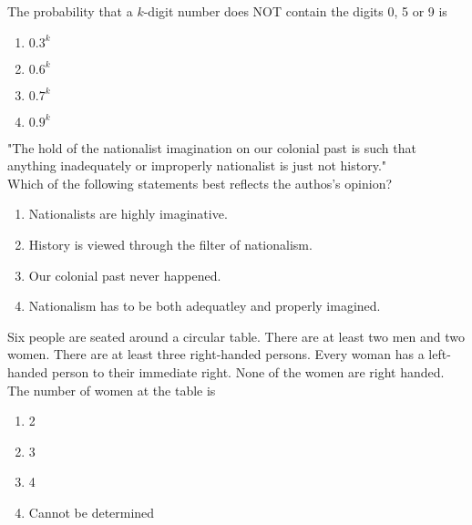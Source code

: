     \item The probability that a $k$-digit number does NOT contain the digits 0, 5 or 9 is
        \hfill{}
        \begin{multicols}{4}
            \begin{enumerate}
                \item $0.3^k$
                    \columnbreak
                \item $0.6^k$
                    \columnbreak
                \item $0.7^k$
                    \columnbreak
                \item $0.9^k$
            \end{enumerate}
        \end{multicols}

    \item "The hold of the nationalist imagination on our colonial past is such that anything 
        inadequately or improperly nationalist is just not history."
        \\Which of the following statements best reflects the authos's opinion?
        \hfill{}
        \begin{enumerate}
            \item  Nationalists are highly imaginative.
            \item  History is viewed through the filter of nationalism.
            \item  Our colonial past never happened.
            \item  Nationalism has to be both adequatley and properly imagined.
        \end{enumerate}

    \item Six people are seated around a circular table. There are at least two men and two women. There
        are at least three right-handed persons. Every woman has a left-handed person to their immediate right.
        None of the women are right handed. The number of women at the table is 
        \hfill{}
        \begin{multicols}{4}
            \begin{enumerate}
                \item  2
                    \columnbreak
                \item 3
                    \columnbreak
                \item 4
                    \columnbreak
                \item Cannot be determined
            \end{enumerate}
        \end{multicols}

